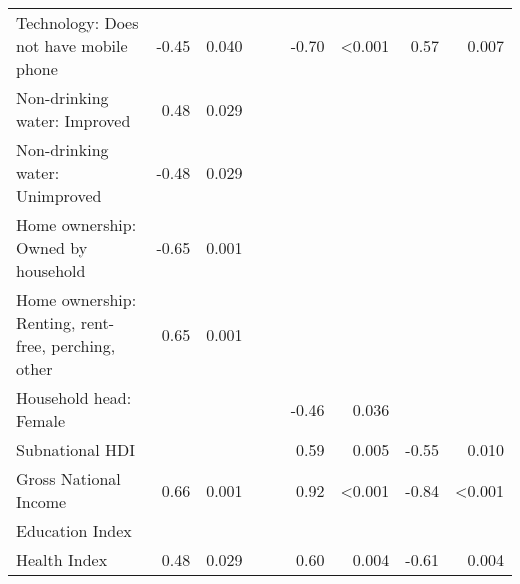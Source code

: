 \begin{tabular}{l r r r r r r r r}
Technology: Does not have mobile phone  &  -0.45  &  0.040  &    &    &  -0.70  &  \textless{}0.001  &  0.57  &  0.007  \\
Non-drinking water: Improved  &  0.48  &  0.029  &    &    &    &    &    &    \\
Non-drinking water: Unimproved  &  -0.48  &  0.029  &    &    &    &    &    &    \\
Home ownership: Owned by household  &  -0.65  &  0.001  &    &    &    &    &    &    \\
Home ownership: Renting, rent-free, perching, other  &  0.65  &  0.001  &    &    &    &    &    &    \\
Household head: Female  &    &    &    &    &  -0.46  &  0.036  &    &    \\
Subnational HDI  &    &    &    &    &  0.59  &  0.005  &  -0.55  &  0.010  \\
Gross National Income  &  0.66  &  0.001  &    &    &  0.92  &  \textless{}0.001  &  -0.84  &  \textless{}0.001  \\
Education Index  &    &    &    &    &    &    &    &    \\
Health Index  &  0.48  &  0.029  &    &    &  0.60  &  0.004  &  -0.61  &  0.004  \\
\bottomrule
\end{tabular}
